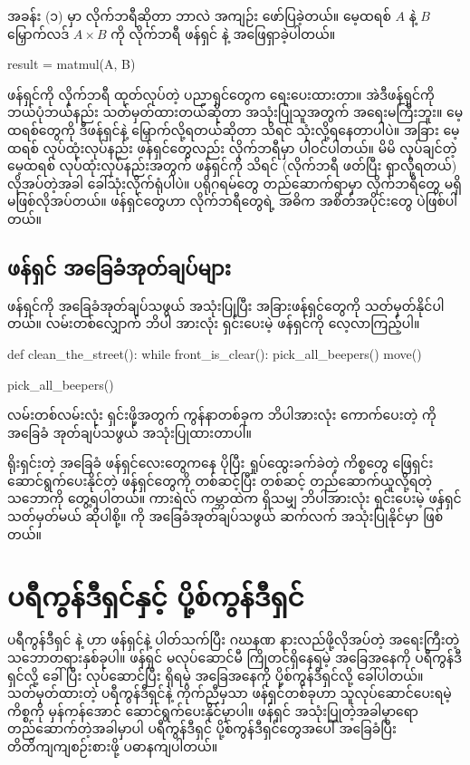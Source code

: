 အခန်း (၁) မှာ လိုက်ဘရီဆိုတာ ဘာလဲ အကျဉ်း ဖော်ပြခဲ့တယ်။    မေ့ထရစ် $A$ နဲ့ $B$ မြှောက်လဒ် $A \times B$ ကို  လိုက်ဘရီ ဖန်ရှင်  နဲ့ အဖြေရှာခဲ့ပါတယ်။ 
%
\begin{py}
result = matmul(A, B)
\end{py}
%
 ဖန်ရှင်ကို လိုက်ဘရီ ထုတ်လုပ်တဲ့ ပညာရှင်တွေက ရေးပေးထားတာ။ အဲဒီဖန်ရှင်ကို ဘယ်ပုံဘယ်နည်း သတ်မှတ်ထားတယ်ဆိုတာ အသုံးပြုသူအတွက် အရေးမကြီးဘူး။ မေ့ထရစ်တွေကို ဒီဖန်ရှင်နဲ့ မြှောက်လို့ရတယ်ဆိုတာ သိရင် သုံးလို့ရနေတာပါပဲ။ အခြား မေ့ထရစ် လုပ်ထုံးလုပ်နည်း ဖန်ရှင်တွေလည်း   လိုက်ဘရီမှာ ပါဝင်ပါတယ်။ မိမိ လုပ်ချင်တဲ့ မေ့ထရစ် လုပ်ထုံးလုပ်နည်းအတွက် ဖန်ရှင်ကို သိရင် (လိုက်ဘရီ  ဖတ်ပြီး ရှာလို့ရတယ်) လိုအပ်တဲ့အခါ ခေါ်သုံးလိုက်ရုံပါပဲ။  ပရိုဂရမ်တွေ တည်ဆောက်ရာမှာ လိုက်ဘရီတွေ မရှိမဖြစ်လိုအပ်တယ်။ ဖန်ရှင်တွေဟာ လိုက်ဘရီတွေရဲ့ အဓိက အစိတ်အပိုင်းတွေ ပဲဖြစ်ပါတယ်။

\subsection*{ဖန်ရှင် အခြေခံအုတ်ချပ်များ}
 ဖန်ရှင်ကို အခြေခံအုတ်ချပ်သဖွယ် အသုံးပြုပြီး အခြားဖန်ရှင်တွေကို သတ်မှတ်နိုင်ပါတယ်။ လမ်းတစ်လျှောက် ဘိပါ အားလုံး ရှင်းပေးမဲ့  ဖန်ရှင်ကို လေ့လာကြည့်ပါ။
%
\begin{py}
def clean_the_street():
    while front_is_clear():
        pick_all_beepers()
        move()

    pick_all_beepers()
\end{py}
%
လမ်းတစ်လမ်းလုံး ရှင်းဖို့အတွက် ကွန်နာတစ်ခုက ဘိပါအားလုံး ကောက်ပေးတဲ့  ကို အခြေခံ အုတ်ချပ်သဖွယ် အသုံးပြုထားတာပါ။ 

ရိုးရှင်းတဲ့ အခြေခံ ဖန်ရှင်လေးတွေကနေ ပိုပြီး ရှုပ်ထွေးခက်ခဲတဲ့ ကိစ္စတွေ ဖြေရှင်း ဆောင်ရွက်ပေးနိုင်တဲ့ ဖန်ရှင်တွေကို တစ်ဆင့်ပြီး တစ်ဆင့် တည်ဆောက်ယူလို့ရတဲ့ သဘောကို တွေ့ရပါတယ်။ ကားရဲလ် ကမ္ဘာထဲက ရှိသမျှ ဘိပါအားလုံး ရှင်းပေးမဲ့  ဖန်ရှင် သတ်မှတ်မယ် ဆိုပါစို့။  ကို အခြေခံအုတ်ချပ်သဖွယ် ဆက်လက် အသုံးပြုနိုင်မှာ ဖြစ်တယ်။ 

\section{ပရီကွန်ဒီရှင်နှင့် ပို့စ်ကွန်ဒီရှင်}
ပရီကွန်ဒီရှင်  နဲ့  ဟာ ဖန်ရှင်နဲ့ ပါတ်သက်ပြီး ဂဃနဏ နားလည်ဖို့လိုအပ်တဲ့ အရေးကြီးတဲ့ သဘောတရားနှစ်ခုပါ။ ဖန်ရှင် မလုပ်ဆောင်မီ ကြိုတင်ရှိနေရမဲ့ အခြေအနေကို  ပရီကွန်ဒီရှင်လို့ ခေါ်ပြီး လုပ်ဆောင်ပြီး ရှိရမဲ့ အခြေအနေကို ပို့စ်ကွန်ဒီရှင်လို့ ခေါ်ပါတယ်။ သတ်မှတ်ထားတဲ့ ပရီကွန်ဒီရှင်နဲ့ ကိုက်ညီမှသာ ဖန်ရှင်တစ်ခုဟာ သူလုပ်ဆောင်ပေးရမဲ့ ကိစ္စကို မှန်ကန်အောင် ဆောင်ရွက်ပေးနိုင်မှာပါ။ ဖန်ရှင် အသုံးပြုတဲ့အခါမှာရော တည်ဆောက်တဲ့အခါမှာပါ ပရီကွန်ဒီရှင် ပို့စ်ကွန်ဒီရှင်တွေအပေါ် အခြေခံပြီး တိတိကျကျစဉ်းစားဖို့ ပဓာနကျပါတယ်။

